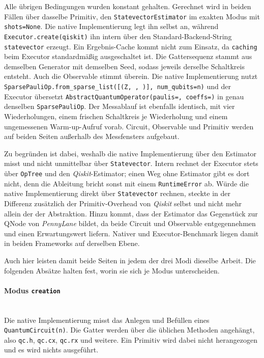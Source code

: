 Alle übrigen Bedingungen wurden konstant gehalten. Gerechnet wird in beiden Fällen
über dasselbe Primitiv, den \texttt{StatevectorEstimator} im exakten Modus mit
\texttt{shots=None}. Die native Implementierung legt ihn selbst an, während
\texttt{Executor.\allowbreak create\allowbreak(\textquotedbl qiskit\textquotedbl)} ihn intern über den Standard-Backend-String
\texttt{\textquotedbl statevector\textquotedbl} erzeugt. Ein Ergebnis-Cache kommt nicht zum Einsatz, da
\texttt{caching} beim Executor standardmäßig ausgeschaltet ist. Die Gattersequenz
stammt aus demselben Generator mit demselben Seed, sodass jeweils derselbe
Schaltkreis entsteht. Auch die Observable stimmt überein. Die native Implementierung nutzt
\texttt{SparsePauliOp.\allowbreak from\_sparse\_list\allowbreak([(\textquotedbl Z\textquotedbl, \allowbreak [0], )], \allowbreak num\_qubits=n)} und der
Executor übersetzt \texttt{Abstract\allowbreak Quantum\allowbreak Operator\allowbreak(paulis=, \allowbreak coeffs=\allowbreak[1.0])} in
genau denselben \texttt{SparsePauliOp}. Der Messablauf ist ebenfalls identisch, mit
vier Wiederholungen, einem frischen Schaltkreis je Wiederholung und einem
ungemessenen Warm-up-Aufruf vorab. Circuit, Observable und Primitiv werden auf beiden
Seiten außerhalb des Messfensters aufgebaut.

Zu begründen ist dabei, weshalb die native Implementierung über den Estimator misst und nicht
unmittelbar über \texttt{Statevector}. Intern rechnet der Executor stets über
\texttt{OpTree} und den \textit{Qiskit}-Estimator; einen Weg ohne Estimator gibt es
dort nicht, denn die Ableitung bricht sonst mit einem \texttt{RuntimeError} ab.
Würde die native Implementierung direkt über \texttt{Statevector} rechnen, steckte in der Differenz
zusätzlich der Primitiv-Overhead von \textit{Qiskit} selbst und nicht mehr allein
der der Abstraktion. Hinzu kommt, dass der Estimator das Gegenstück zur QNode von
\textit{PennyLane} bildet, da beide Circuit und Observable entgegennehmen und einen
Erwartungswert liefern. Nativer und Executor-Benchmark liegen damit in beiden
Frameworks auf derselben Ebene.

Auch hier leisten damit beide Seiten in jedem der drei Modi dieselbe Arbeit. Die
folgenden Absätze halten fest, worin sie sich je Modus unterscheiden.

\paragraph*{Modus \texttt{creation}}\mbox{}\\
Die native Implementierung misst das Anlegen und Befüllen eines \verb|QuantumCircuit(n)|. Die
Gatter werden über die üblichen Methoden angehängt, also \texttt{qc.h},
\texttt{qc.cx}, \texttt{qc.rx} und weitere. Ein Primitiv wird dabei nicht
herangezogen und es wird nichts ausgeführt.

